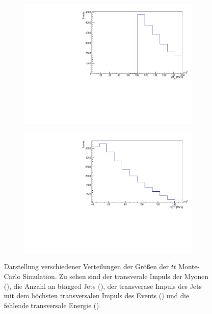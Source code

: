 \begin{figure}
\begin{subfigure}{0.5\textwidth}
    \includegraphics[width=\linewidth]{plots_and_txt/ttbar.mu_selected_/ttbar.mu_selected_jet_pt.pdf}
    \caption{}
    \label{fig:jet_pt_good}
  \end{subfigure}%
  \begin{subfigure}{0.5\textwidth}
    \centering
    \includegraphics[width=\linewidth]{plots_and_txt/ttbar.mu_selected_/ttbar.mu_selected_met_et.pdf}
    \caption{}
    \label{fig:met_et}
  \end{subfigure}%
  \caption{Darstellung verschiedener Verteilungen der Größen der $t\bar{t}$ Monte-Carlo Simulation.
  Zu sehen sind der transverale Impuls der Myonen (), die Anzahl an btagged Jets (), der transverase Impuls des Jets mit dem höchsten transversalen Impuls des Events () und die fehlende transversale Energie ().
  }
  \label{fig:Distributions}
\end{figure}

